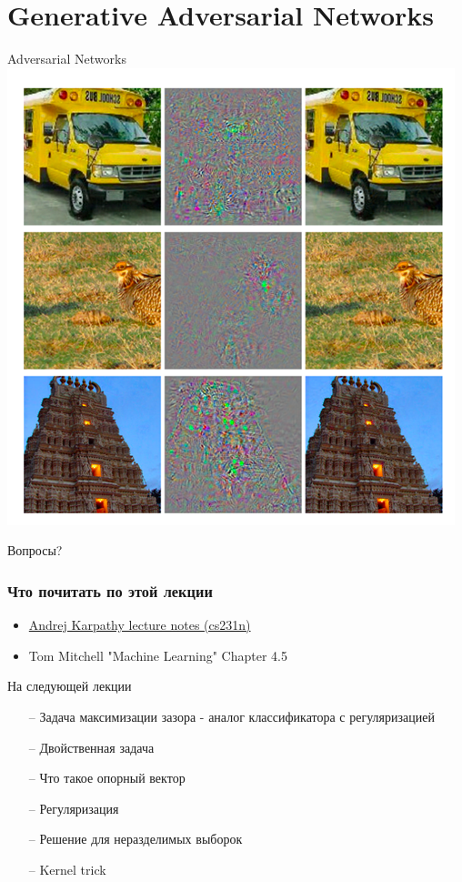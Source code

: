 \documentclass[10pt]{beamer}
\begin{document}
\section{Generative Adversarial Networks}

{
\begin{frame}{Adversarial Networks}
  \centering 
  \includegraphics[height=0.9 \textheight, width=0.9 \textwidth, keepaspectratio = true]{images/GAN}   
\end{frame}
}

\begin{frame}[standout]
  Вопросы?
\end{frame}

\appendix

\begin{frame}\frametitle{Что почитать по этой лекции}
  \begin{itemize}
    \item \href{http://cs231n.github.io/neural-networks-1/}{Andrej Karpathy lecture notes (cs231n)}
    \item Tom Mitchell "Machine Learning" Chapter 4.5
  \end{itemize}
\end{frame}

\begin{frame}{На следующей лекции}
	\begin{itemize}
	  	\item[--] Задача максимизации зазора - аналог классификатора с регуляризацией
    \item[--] Двойственная задача 
    \item[--] Что такое опорный вектор
    \item[--] Регуляризация
    \item[--] Решение для неразделимых выборок
    \item[--] Kernel trick    
	\end{itemize}
\end{frame}
\end{document}
